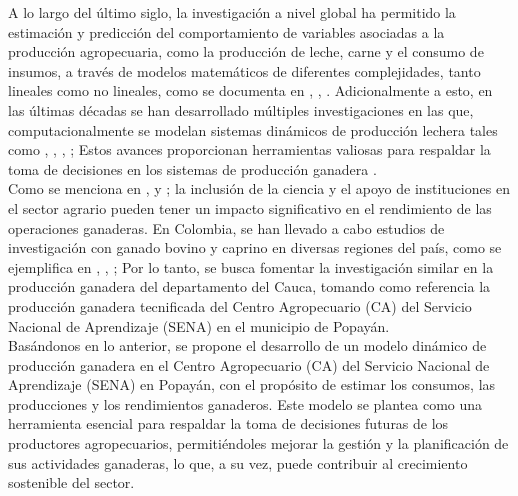 A lo largo del último siglo, la investigación a nivel global ha permitido la estimación y predicción del comportamiento de variables asociadas a la producción agropecuaria, como la producción de leche, carne y el consumo de insumos, a través de modelos matemáticos de diferentes complejidades, tanto lineales como no lineales, como se documenta en \cite{lechepaisa1}, \cite{caprinos}, \cite{colombiaherd}. Adicionalmente a esto, en las últimas décadas se han desarrollado múltiples investigaciones en las que, computacionalmente se modelan sistemas dinámicos de producción lechera tales como \cite{janaina1}, \cite{janaina2}, \cite{hdmwallace}, \cite{avila1}; Estos avances proporcionan herramientas valiosas para respaldar la toma de decisiones en los sistemas de producción ganadera \cite{gavira}.\\


Como se menciona en \cite{minagricultura}, \cite{ashby} y \cite{fao}; la inclusión de la ciencia y el apoyo de instituciones en el sector agrario pueden tener un impacto significativo en el rendimiento de las operaciones ganaderas. En Colombia, se han llevado a cabo estudios de investigación con ganado bovino y caprino en diversas regiones del país, como se ejemplifica en \cite{lechepaisa1}, \cite{lechepaisa2}, \cite{lechepastusa}; Por lo tanto, se busca fomentar la investigación similar en la producción ganadera del departamento del Cauca, tomando como referencia la producción ganadera tecnificada del Centro Agropecuario (CA) del Servicio Nacional de Aprendizaje (SENA) en el municipio de Popayán.\\

Basándonos en lo anterior, se propone el desarrollo de un modelo dinámico de producción ganadera en el Centro Agropecuario (CA) del Servicio Nacional de Aprendizaje (SENA) en Popayán, con el propósito de estimar los consumos, las producciones y los rendimientos ganaderos. Este modelo se plantea como una herramienta esencial para respaldar la toma de decisiones futuras de los productores agropecuarios, permitiéndoles mejorar la gestión y la planificación de sus actividades ganaderas, lo que, a su vez, puede contribuir al crecimiento sostenible del sector.

